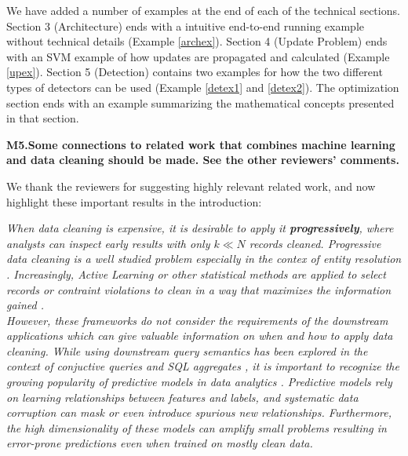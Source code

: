 We have added a number of examples at the end of each of the technical sections. Section 3 (Architecture) ends with a intuitive end-to-end running example without technical details (Example \ref{archex}).
Section 4 (Update Problem) ends with an SVM example of how updates are propagated and calculated (Example \ref{upex}).
Section 5 (Detection) contains two examples for how the two different types of detectors can be used (Example \ref{detex1} and \ref{detex2}).
The optimization section ends with an example summarizing the mathematical concepts presented in that section.

\vspace{0.5em}

\noindent\textbf{M5.Some connections to related work that combines machine learning and data cleaning should be made. See the other reviewers' comments.}

We thank the reviewers for suggesting highly relevant related work, and now highlight these important results in the introduction:

\emph{When data cleaning is expensive, it is desirable to apply it \textbf{progressively}, where analysts can inspect early results with only $k \ll N$ records cleaned.
Progressive data cleaning is a well studied problem especially in the contex of entity resolution \cite{whang2014incremental, papenbrock2015progressive, gruenheid2014incremental}.
Increasingly, Active Learning \cite{settles2010active} or other statistical methods are applied to select records or contraint violations to clean in a way that maximizes the information gained \cite{DBLP:journals/pvldb/YakoutENOI11, gokhale2014corleone, yakout2013don}.\\
However, these frameworks do not consider the requirements of the downstream applications which can give valuable information on when and how to apply data cleaning.
While using downstream query semantics has been explored in the context of conjuctive queries \cite{DBLP:conf/sigmod/BergmanMNT15} and SQL aggregates \cite{wang1999sample}, it is important to recognize the growing popularity of predictive models in data analytics \cite{bdas, alexandrov2014stratosphere, crotty2014tupleware, hellerstein2012madlib}.
Predictive models rely on learning relationships between features and labels, and systematic data corruption \cite{taylor1982introduction} can mask or even introduce spurious new relationships.
Furthermore, the high dimensionality of these models can amplify small problems \cite{xiaofeature} resulting in error-prone predictions even when trained on mostly clean data.}

